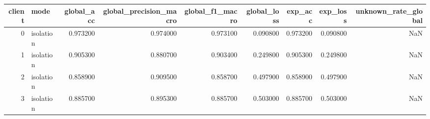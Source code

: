 \begin{tabular}{rlrrrrrrr}
\toprule
client & mode & global_acc & global_precision_macro & global_f1_macro & global_loss & exp_acc & exp_loss & unknown_rate_global \\
\midrule
0 & isolation & 0.973200 & 0.974000 & 0.973100 & 0.090800 & 0.973200 & 0.090800 & NaN \\
1 & isolation & 0.905300 & 0.880700 & 0.903400 & 0.249800 & 0.905300 & 0.249800 & NaN \\
2 & isolation & 0.858900 & 0.909500 & 0.858700 & 0.497900 & 0.858900 & 0.497900 & NaN \\
3 & isolation & 0.885700 & 0.895300 & 0.885700 & 0.503000 & 0.885700 & 0.503000 & NaN \\
\bottomrule
\end{tabular}
